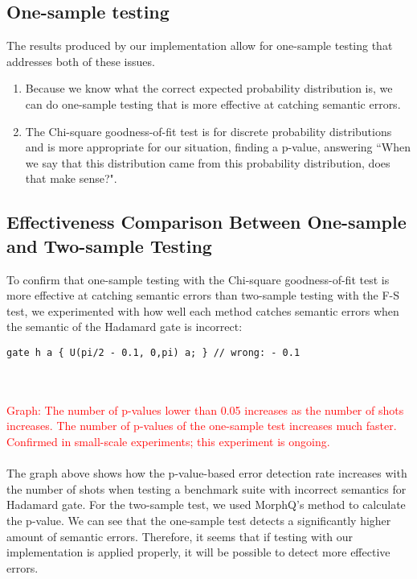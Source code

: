 \documentclass[10pt,a4paper]{article}
\newcommand{\<}{\langle}
\renewcommand{\>}{\rangle}
\newcommand{\red}[1]{\textcolor{red}{#1}}
\begin{document}
\subsection{One-sample testing}

The results produced by our implementation allow for one-sample testing that addresses both of these issues.
\begin{enumerate}
  \item
    Because we know what the correct expected probability distribution is, we can do one-sample
    testing that is more effective at catching semantic errors.
  \item
    The Chi-square goodness-of-fit test is for discrete probability distributions and is more
    appropriate for our situation, finding a p-value, answering ``When we say that this distribution
    came from this probability distribution, does that make sense?".
\end{enumerate}

\subsection{Effectiveness Comparison Between One-sample and Two-sample Testing}
To confirm that one-sample testing with the Chi-square goodness-of-fit test is more effective at
catching semantic errors than two-sample testing with the F-S test, we experimented with how well
each method catches semantic errors when the semantic of the Hadamard gate is incorrect:

\begin{lstlisting}
gate h a { U(pi/2 - 0.1, 0,pi) a; } // wrong: - 0.1
\end{lstlisting}

\\
\\
\red{Graph: The number of p-values lower than 0.05 increases as the number of shots increases. The
  number of p-values of the one-sample test increases much faster. Confirmed in small-scale
experiments; this experiment is ongoing.} \\
\\

The graph above shows how the p-value-based error detection rate increases with the number of shots
when testing a benchmark suite with incorrect semantics for Hadamard gate. For the two-sample test,
we used MorphQ's method to calculate the p-value.
We can see that the one-sample test detects a significantly higher amount of semantic errors.
Therefore, it seems that if testing with our implementation is applied properly, it will be possible
to detect more effective errors.
\end{document}

